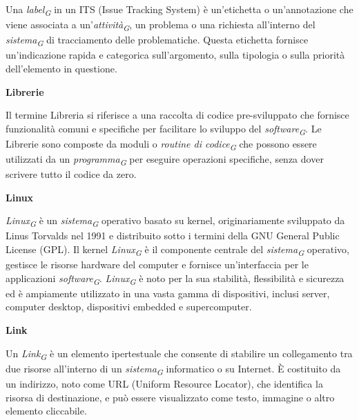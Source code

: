 \documentclass{article}
\begin{document}
\vspace{0.1cm}

Una \textit{label}\textsubscript{\textit{G}} in un ITS (Issue Tracking System) è un'etichetta o un'annotazione che viene associata a un'\textit{attività}\textsubscript{\textit{G}}, un problema o una richiesta all'interno del \textit{sistema}\textsubscript{\textit{G}} di tracciamento delle problematiche. Questa etichetta fornisce un'indicazione rapida e categorica sull'argomento, sulla tipologia o sulla priorità dell'elemento in questione.

\vspace{0.4cm}

\textbf{Librerie}

\vspace{0.1cm}

Il termine Libreria si riferisce a una raccolta di codice pre-sviluppato che fornisce funzionalità comuni e specifiche per facilitare lo sviluppo del \textit{software}\textsubscript{\textit{G}}. Le Librerie sono composte da moduli o \textit{routine di codice}\textsubscript{\textit{G}} che possono essere utilizzati da un \textit{programma}\textsubscript{\textit{G}} per eseguire operazioni specifiche, senza dover scrivere tutto il codice da zero.

\vspace{0.4cm}

\textbf{Linux}

\vspace{0.1cm}

\textit{Linux}\textsubscript{\textit{G}} è un \textit{sistema}\textsubscript{\textit{G}} operativo basato su kernel, originariamente sviluppato da Linus Torvalds nel 1991 e distribuito sotto i termini della GNU General Public License (GPL). Il kernel \textit{Linux}\textsubscript{\textit{G}} è il componente centrale del \textit{sistema}\textsubscript{\textit{G}} operativo, gestisce le risorse hardware del computer e fornisce un'interfaccia per le applicazioni \textit{software}\textsubscript{\textit{G}}. \textit{Linux}\textsubscript{\textit{G}} è noto per la sua stabilità, flessibilità e sicurezza ed è ampiamente utilizzato in una vasta gamma di dispositivi, inclusi server, computer desktop, dispositivi embedded e supercomputer. 

\vspace{0.4cm}

\textbf{Link}

\vspace{0.1cm}

Un \textit{Link}\textsubscript{\textit{G}} è un elemento ipertestuale che consente di stabilire un collegamento tra due risorse all'interno di un \textit{sistema}\textsubscript{\textit{G}} informatico o su Internet. È costituito da un indirizzo, noto come URL (Uniform Resource Locator), che identifica la risorsa di destinazione, e può essere visualizzato come testo, immagine o altro elemento cliccabile. 
\end{document}
